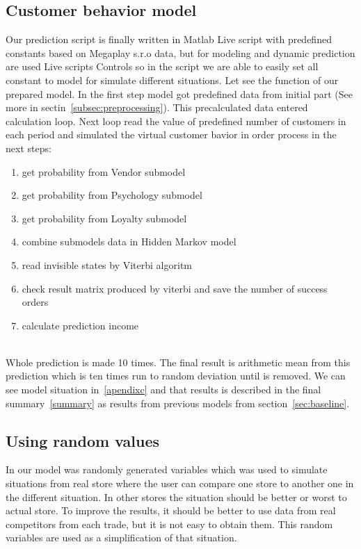 \subsection{Customer behavior model} \label{sec:cbm}
Our prediction script is finally written in Matlab Live script with predefined constants based on Megaplay s.r.o data,
but for modeling and dynamic prediction are used Live scripts Controls so in the script we are able to easily set all constant to model for simulate different situations.
Let see the function of our prepared model.
In the first step model got predefined data from initial part (See more in sectin~\ref{subsec:preprocessing}).
This precalculated data entered calculation loop.
Next loop read the value of predefined number of customers in each period and simulated the virtual customer bavior in order process in the next steps:
\begin{enumerate}
    \item get probability from Vendor submodel
    \item get probability from Psychology submodel
    \item get probability from Loyalty submodel
    \item combine submodels data in Hidden Markov model
    \item read invisible states by Viterbi algoritm
    \item check result matrix produced by viterbi and save the number of success orders
    \item calculate prediction income
\end{enumerate}\\
Whole prediction is made 10 times. The final result is arithmetic mean from this prediction which is ten times run to random deviation until is removed.
We can see model situation in~\ref{apendixc} and that results is described in the final summary~\ref{summary} as results from previous models from section~\ref{sec:baseline}.
\subsection{Using random values} \label{subsec:rand}
In our model was randomly generated variables which was used to simulate situations from real store where the user can compare one store to another one in the different situation.
In other stores the situation should be better or worst to actual store.
To improve the results, it should be better to use data from real competitors from each trade, but it is not easy to obtain them.
This random variables are used as a simplification of that situation.
